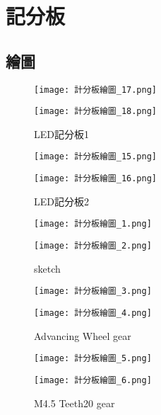 \chapter{記分板}
\section{繪圖}
\begin{figure}[hbt!]
  \centering
  \texttt{[image: 計分板繪圖\_17.png]}
\end{figure}
\begin{figure}[hbt!]
  \centering
  \texttt{[image: 計分板繪圖\_18.png]}
  \caption{LED記分板1}
  \label{fig:photo1}
\end{figure}

\begin{figure}[hbt!]
  \centering
  \texttt{[image: 計分板繪圖\_15.png]}
\end{figure}
\begin{figure}[hbt!]
  \centering
  \texttt{[image: 計分板繪圖\_16.png]}
  \caption{LED記分板2}
  \label{fig:photo2}
\end{figure}

\begin{figure}[hbt!]
  \centering
  \texttt{[image: 計分板繪圖\_1.png]}
\end{figure}
\begin{figure}[hbt!]
  \centering
  \texttt{[image: 計分板繪圖\_2.png]}
  \caption{sketch}
  \label{fig:photo3}
\end{figure}

\begin{figure}[hbt!]
  \centering
  \texttt{[image: 計分板繪圖\_3.png]}
\end{figure}
\begin{figure}[hbt!]
  \centering
  \texttt{[image: 計分板繪圖\_4.png]}
  \caption{Advancing Wheel gear}
  \label{fig:photo4}
\end{figure}

\begin{figure}[hbt!]
  \centering
  \texttt{[image: 計分板繪圖\_5.png]}
\end{figure}
\begin{figure}[hbt!]
  \centering
  \texttt{[image: 計分板繪圖\_6.png]}
  \caption{M4.5 Teeth20 gear}
  \label{fig:photo5}
\end{figure}

